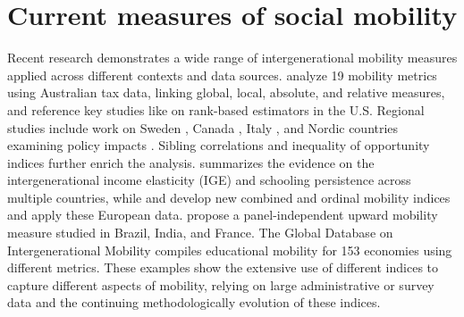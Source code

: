 \section{Current measures of social mobility} \label{sec:current}

Recent research demonstrates a wide range of intergenerational mobility measures applied across different contexts and data sources. \citet{deutscher2023measuring} analyze 19 mobility metrics using Australian tax data, linking global, local, absolute, and relative measures, and reference key studies like \citet{chetty2014land} on rank-based estimators in the U.S. Regional studies include work on Sweden \citep{heidrich2017intergenerational}, Canada \citep{corak2020canadian}, Italy \citep{acciari2022and}, and Nordic countries examining policy impacts \citep{butikofer2025breaking, pekkarinen2009school, nybom2017biases}. Sibling correlations \citep{mazumder2008sibling, bjorklund2010more} and inequality of opportunity indices \citep{mitnik2020inequality} further enrich the analysis. \citet{blanden2013cross} summarizes the evidence on the intergenerational income elasticity (IGE) and schooling persistence across multiple countries, while \citet{di2013new} and \citet{apouey2023ordinal} develop new combined and ordinal mobility indices and apply these European data. \citet{ray2023measuring} propose a panel-independent upward mobility measure studied in Brazil, India, and France. The Global Database on Intergenerational Mobility \citep{van2024intergenerational} compiles educational mobility for 153 economies using different metrics. These examples show the extensive use of different indices to capture different aspects of mobility, relying on large administrative or survey data and the continuing methodologically evolution of these indices.

